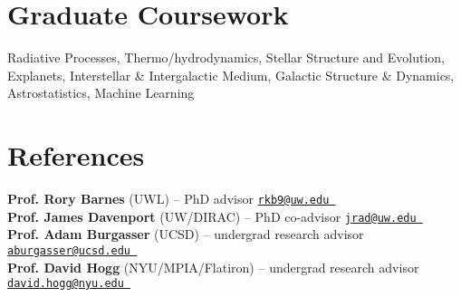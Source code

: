 \documentclass[a4,11pt]{article}
\let\orighref\href
\renewcommand{\href}[2]{\orighref{#1}{#2\,\scriptsize\faExternalLink}}
\begin{document}

\section{Graduate Coursework}

Radiative Processes, Thermo/hydrodynamics, Stellar Structure and Evolution, Explanets, Interstellar \& Intergalactic Medium, Galactic Structure \& Dynamics, Astrostatistics, Machine Learning

\section{References}

\textbf{Prof. Rory Barnes} (UWL) -- PhD advisor \hfill {\tt \href{rkb9@uw.edu}{rkb9@uw.edu}} \\
\textbf{Prof. James Davenport} (UW/DIRAC) -- PhD co-advisor \hfill {\tt \href{jrad@uw.edu}{jrad@uw.edu}} \\
\textbf{Prof. Adam Burgasser} (UCSD) -- undergrad research advisor \hfill {\tt \href{aburgasser@ucsd.edu}{aburgasser@ucsd.edu}}   \\
\textbf{Prof. David Hogg} (NYU/MPIA/Flatiron) -- undergrad research advisor \hfill {\tt \href{david.hogg@nyu.edu}{david.hogg@nyu.edu}}  \\

\end{document}
